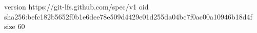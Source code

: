 version https://git-lfs.github.com/spec/v1
oid sha256:befc182b5652f0b1e6dee78e509d4429e01d255da04bc7f0ac00a10946b18d4f
size 60
